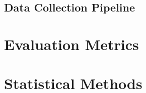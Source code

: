 \subsection{Data Collection Pipeline}
\label{sec:real:data_collection}

\section{Evaluation Metrics}
\label{sec:real:metrics}

\section{Statistical Methods}
\label{sec:real:stats}
